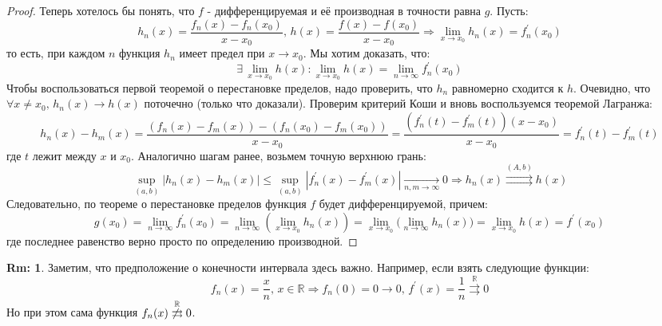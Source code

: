 \documentclass[12pt]{article}
\newcommand{\MR}{\mathbb{R}}
\theoremstyle{definition}
\newtheorem{rem}{Rm:}
\newcommand{\uconv}[1]{\overset{#1}{\rightrightarrows}}
\begin{document}
\begin{proof}
	Теперь хотелось бы понять, что $f$ - дифференцируемая и её производная в точности равна $g$. Пусть:
	$$
		h_n(x) = \dfrac{f_n(x) - f_n(x_0)}{x -x_0}, \, h(x) = \dfrac{f(x) - f(x_0)}{x - x_0} \Rightarrow \lim\limits_{x \to x_0} h_n(x) = f_n^\prime(x_0)
	$$ 
	то есть, при каждом $n$ функция $h_n$ имеет предел при $x \to x_0$. Мы хотим доказать, что: 
	$$
		\exists \, \lim\limits_{x \to x_0}h(x) \colon 	\lim\limits_{x \to x_0}h(x) = \lim\limits_{n \to \infty}f^\prime_n(x_0)
	$$
	Чтобы воспользоваться первой теоремой о перестановке пределов, надо проверить, что $h_n$ равномерно сходится к $h$. Очевидно, что $\forall x \neq x_0, \, h_n(x) \to h(x)$ поточечно (только что доказали). Проверим критерий Коши и вновь воспользуемся теоремой Лагранжа:
	$$
		h_n(x) - h_m(x) = \dfrac{(f_n(x) - f_m(x)) - (f_n(x_0) - f_m(x_0))}{x - x_0} = \dfrac{(f_n^\prime(t) - f_m^\prime(t))(x - x_0)}{x - x_0} = f_n^\prime(t) - f_m^\prime(t)
	$$
	где $t$ лежит между $x$ и $x_0$. Аналогично шагам ранее, возьмем точную верхнюю грань:
	$$
		\sup\limits_{(a,b)}|h_n(x) - h_m(x)| \leq \sup\limits_{(a,b)} | f_n^\prime(x) - f_m^\prime(x)|  \xrightarrow[n,m \to \infty]{}  0 \Rightarrow h_n(x) \uconv{(A,b)}h(x)
	$$
	Следовательно, по теореме о перестановке пределов функция $f$ будет дифференцируемой, причем:
	$$
		g(x_0) = \lim\limits_{n \to \infty} f_n^\prime(x_0) = \lim\limits_{n \to \infty}  \left(\lim\limits_{x \to x_0} h_n(x)\right) = \lim\limits_{x \to x_0}\bigg(\lim\limits_{n \to \infty}h_n(x)\bigg) = \lim\limits_{x \to x_0} h(x) = f^\prime(x_0)
	$$
	где последнее равенство верно просто по определению производной.
\end{proof}
\begin{rem}
	Заметим, что предположение о конечности интервала здесь важно. Например, если взять следующие функции:
	$$
		f_n(x) = \dfrac{x}{n}, \, x \in \MR \Rightarrow f_n(0) = 0 \to 0,\, f^\prime(x) = \dfrac{1}{n} \uconv{\MR} 0
	$$
	Но при этом сама функция $f_n(x) \not\uconv{\MR} 0$.
\end{rem}

\newpage
\end{document}

